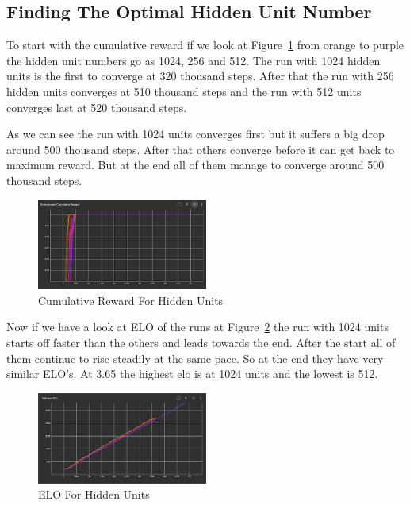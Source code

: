 \documentclass{LSkill}
\begin{document}
\subsection{Finding The Optimal Hidden Unit Number}
To start with the cumulative reward if we look at Figure~\ref{fig:Cumulative Reward For Hidden Units} from orange to purple the hidden unit numbers go as 1024, 256 and 512. The run with 1024 hidden units is the first to converge at 320 thousand steps. After that the run with 256 hidden units converges at 510 thousand steps and the run with 512 units converges last at 520 thousand steps.

As we can see the run with 1024 units converges first but it suffers a big drop around 500 thousand steps. After that others converge before it can get back to maximum reward. But at the end all of them manage to converge around 500 thousand steps.

\begin{figure}[htbp]
    \centering
    \includegraphics[width=0.5\textwidth]{figure 7.png} 
    \caption{Cumulative Reward For Hidden Units}
    \label{fig:Cumulative Reward For Hidden Units}
\end{figure}

Now if we have a look at ELO of the runs at Figure~\ref{fig:ELO For Hidden Units} the run with 1024 units starts off faster than the others and leads towards the end. After the start all of them continue to rise steadily at the same pace. So at the end they have very similar ELO’s. At 3.65 the highest elo is at 1024 units and the lowest is 512.

\begin{figure}[htbp]
    \centering
    \includegraphics[width=0.5\textwidth]{figure 8.png} 
    \caption{ELO For Hidden Units}
    \label{fig:ELO For Hidden Units}
\end{figure}
\end{document}
